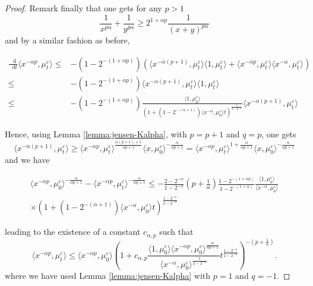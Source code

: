 \documentclass[a4paper,11pt, reqno]{amsart}
\newcommand{\eps}{\varepsilon}
\newcommand{\dd}{\mathop{}\!\mathrm{d}}
\newcommand{\1}{\mathbbm{1}}
\theoremstyle{plain}
\theoremstyle{definition}
\begin{document}
{\begin{proof}
  Remark finally that one gets for any $p > 1$
  \[ \frac{1}{x^{p \alpha}} + \frac{1}{y^{p \alpha}} \ge 2^{1 + \alpha
     p} \frac{1}{(x + y)^{p \alpha}} \]
  and by a similar fashion as before,
  
  \begin{align*}
    \frac{\dd}{\dd t} \langle x^{- \alpha p}, \mu^{\eps}_t
    \rangle \le & - (1 - 2^{- (1 + \alpha p)}) (\langle x^{- \alpha (p +
    1)}, \mu^{\eps}_t \rangle \langle 1, \mu^{\eps}_t \rangle +
    \langle x^{- \alpha p}, \mu^{\eps}_t \rangle \langle x^{- \alpha},
    \mu^{\eps}_t \rangle)\\
    \le & - (1 - 2^{- (1 + \alpha p)}) \langle x^{- \alpha (p + 1)},
    \mu^{\eps}_t \rangle \langle 1, \mu^{\eps}_t \rangle\\
    \le & - (1 - 2^{- (1 + \alpha p)}) \frac{\langle 1,
    \mu^{\eps}_0 \rangle}{(1 + (1 - 2^{- (\alpha + 1)}) \langle x^{-
    \alpha}, \mu^{\eps}_0 \rangle t)^{\frac{1}{2 - 2^{- \alpha}}}}
    \langle x^{- \alpha (p + 1)}, \mu^{\eps}_t \rangle
  \end{align*}
  
  Hence, using Lemma \ref{lemma:jensen-Kalpha}, with $p = p + 1$ and $q = p$,
  one gets
  \[ \langle x^{- \alpha (p + 1)}, \mu^{\eps}_t \rangle \ge
     \langle x^{- \alpha p}, \mu^{\eps}_t \rangle^{\frac{\alpha (p + 1)
     + 1}{\alpha p + 1}} \langle x , \mu^{\eps}_0 \rangle^{-
     \frac{\alpha}{\alpha p + 1}} = \langle x^{- \alpha p},
     \mu^{\eps}_t \rangle^{1 + \frac{\alpha}{\alpha p + 1}} \langle x ,
     \mu^{\eps}_0 \rangle^{- \frac{\alpha}{\alpha p + 1}} \]
  and we have
  
  \begin{multline*}
    \langle x^{- \alpha p}, \mu^{\eps}_0 \rangle^{-
    \frac{\alpha}{\alpha p + 1}} - \langle x^{- \alpha p}, \mu^{\eps}_t
    \rangle^{- \frac{\alpha}{\alpha p + 1}} \le - \frac{2 - 2^{-
    \alpha}}{1 - 2^{- \alpha}} \left( p + \frac{1}{\alpha} \right) \frac{1 -
    2^{- (1 + \alpha p)}}{1 - 2^{- (1 + \alpha)}} \frac{\langle 1,
    \mu^{\eps}_0 \rangle}{\langle x^{- \alpha}, \mu^{\eps}_0
    \rangle}\\
    \times (1 + (1 - 2^{- (\alpha + 1)}) \langle x^{- \alpha},
    \mu^{\eps}_0 \rangle t)^{\frac{1 - 2^{- \alpha}}{2 - 2^{- \alpha}}}
  \end{multline*}
  
  leading to the existence of a constant $c_{\alpha, p}$ such that
  \[ \langle x^{- \alpha p}, \mu^{\eps}_t \rangle \le \langle
     x^{- \alpha p}, \mu^{\eps}_0 \rangle \left( 1 + c_{\alpha, p}
     \frac{\langle 1, \mu^{\eps}_0 \rangle \langle x^{- \alpha p},
     \mu^{\eps}_0 \rangle^{\frac{\alpha}{\alpha p + 1}}}{\langle x^{-
     \alpha}, \mu^{\eps}_0 \rangle^{\frac{1}{2 - 2^{- \alpha}}}}
     {t^{\frac{1 - 2^{- \alpha}}{2 - 2^{- \alpha}}}}  \right)^{- \left( p +
     \frac{1}{\alpha} \right)} . \]
  where we have used Lemma \ref{lemma:jensen-Kalpha} with $p = 1$ and $q = -
  1$.
\end{proof}}
\end{document}
